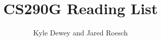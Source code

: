 \documentclass{article}
\begin{document}
\title{CS290G Reading List}
\author{Kyle Dewey and Jared Roesch}
\maketitle







\end{document}

